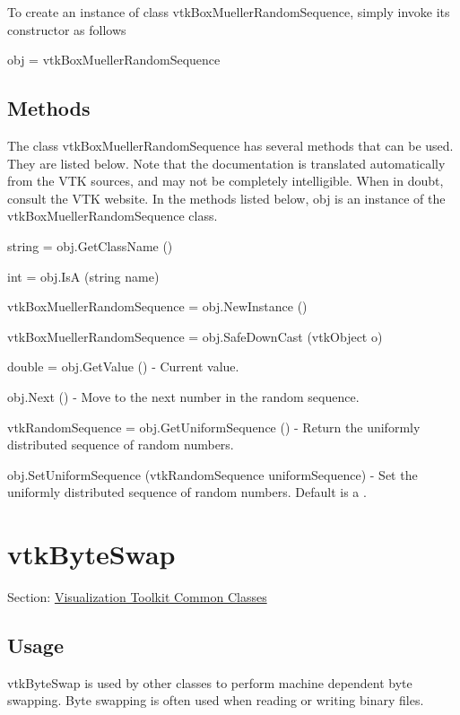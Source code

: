 To create an instance of class vtk\-Box\-Mueller\-Random\-Sequence, simply invoke its constructor as follows \begin{DoxyVerb}  obj = vtkBoxMuellerRandomSequence
\end{DoxyVerb}
 \hypertarget{vtkwidgets_vtkxyplotwidget_Methods}{}\subsection{Methods}\label{vtkwidgets_vtkxyplotwidget_Methods}
The class vtk\-Box\-Mueller\-Random\-Sequence has several methods that can be used. They are listed below. Note that the documentation is translated automatically from the V\-T\-K sources, and may not be completely intelligible. When in doubt, consult the V\-T\-K website. In the methods listed below, {\ttfamily obj} is an instance of the vtk\-Box\-Mueller\-Random\-Sequence class. 
\begin{DoxyItemize}
\item {\ttfamily string = obj.\-Get\-Class\-Name ()}  
\item {\ttfamily int = obj.\-Is\-A (string name)}  
\item {\ttfamily vtk\-Box\-Mueller\-Random\-Sequence = obj.\-New\-Instance ()}  
\item {\ttfamily vtk\-Box\-Mueller\-Random\-Sequence = obj.\-Safe\-Down\-Cast (vtk\-Object o)}  
\item {\ttfamily double = obj.\-Get\-Value ()} -\/ Current value.  
\item {\ttfamily obj.\-Next ()} -\/ Move to the next number in the random sequence.  
\item {\ttfamily vtk\-Random\-Sequence = obj.\-Get\-Uniform\-Sequence ()} -\/ Return the uniformly distributed sequence of random numbers.  
\item {\ttfamily obj.\-Set\-Uniform\-Sequence (vtk\-Random\-Sequence uniform\-Sequence)} -\/ Set the uniformly distributed sequence of random numbers. Default is a .  
\end{DoxyItemize}\hypertarget{vtkcommon_vtkbyteswap}{}\section{vtk\-Byte\-Swap}\label{vtkcommon_vtkbyteswap}
Section\-: \hyperlink{sec_vtkcommon}{Visualization Toolkit Common Classes} \hypertarget{vtkwidgets_vtkxyplotwidget_Usage}{}\subsection{Usage}\label{vtkwidgets_vtkxyplotwidget_Usage}
vtk\-Byte\-Swap is used by other classes to perform machine dependent byte swapping. Byte swapping is often used when reading or writing binary files.

